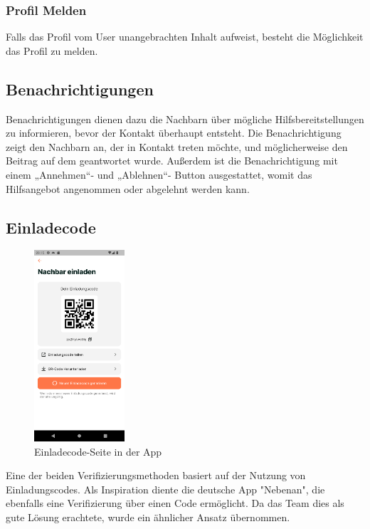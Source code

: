\subsubsection{Profil Melden}
Falls das Profil vom User unangebrachten Inhalt aufweist, besteht die Möglichkeit das Profil zu melden.

\subsection{Benachrichtigungen}
Benachrichtigungen dienen dazu die Nachbarn über mögliche
Hilfsbereitstellungen zu informieren, bevor der Kontakt
überhaupt entsteht. Die Benachrichtigung zeigt den Nachbarn
an, der in Kontakt treten möchte, und möglicherweise den
Beitrag auf dem geantwortet wurde. Außerdem ist die
Benachrichtigung mit einem „Annehmen“- und „Ablehnen“-
Button ausgestattet, womit das Hilfsangebot angenommen oder
abgelehnt werden kann.

\subsection{Einladecode}

\begin{figure}[H]
  \centering
  \includegraphics[width=0.3\textwidth]{pics/einladecode-page.png}
  \caption{Einladecode-Seite in der App}
  \label{fig:einladecode}
\end{figure}
Eine der beiden Verifizierungsmethoden basiert auf der Nutzung von Einladungscodes. Als Inspiration diente die deutsche App "Nebenan", die ebenfalls eine Verifizierung über einen Code ermöglicht. Da das Team dies als gute Lösung erachtete, wurde ein ähnlicher Ansatz übernommen.

